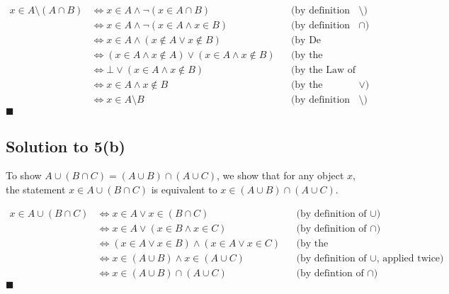 \documentclass{scrartcl}
\begin{document}
    \begin{align*}
        x \in A \setminus (A \cap B) 
        &\Leftrightarrow x \in A \wedge \neg (x \in A \cap B) 
        && \text{(by definition of $\setminus$)} \\
        &\Leftrightarrow x \in A \wedge \neg (x \in A \wedge x \in B)
        && \text{(by definition of $\cap$)} \\
        &\Leftrightarrow x \in A \wedge (x \notin A \vee x \notin B)
        && \text{(by De Morgan's Law)} \\
        &\Leftrightarrow (x \in A \wedge x \notin A) \vee (x \in A \wedge x \notin B)
        && \text{(by the Distributive Law)} \\
        &\Leftrightarrow \bot \vee (x \in A \wedge x \notin B)
        && \text{(by the Law of Contradiction)} \\
        &\Leftrightarrow x \in A \wedge x \notin B
        && \text{(by the Identity Law for $\vee$)} \\
        &\Leftrightarrow x \in A \setminus B
        && \text{(by definition of $\setminus$)}
    \end{align*}
    \hfill $\blacksquare$


    \subsection*{Solution to 5(b)}
    To show $A \cup (B \cap C) = (A \cup B) \cap (A \cup C)$, we show that for any object $x$, the statement $x \in A \cup (B \cap C)$ is equivalent to $x \in (A \cup B) \cap (A \cup C)$.

    \begin{align*}
        x \in A \cup (B \cap C)
        &\Leftrightarrow x \in A \vee x \in (B \cap C)
        && \text{(by definition of $\cup$)} \\
        &\Leftrightarrow x \in A \vee (x \in B \wedge x \in C)
        && \text{(by definition of $\cap$)} \\
        &\Leftrightarrow (x \in A \vee x \in B) \wedge (x \in A \vee x \in C)
        && \text{(by the Distributive Law)} \\
        &\Leftrightarrow x \in (A \cup B) \wedge x \in (A \cup C)
        && \text{(by definition of $\cup$, applied twice)} \\
        &\Leftrightarrow x \in (A \cup B) \cap (A \cup C)
        && \text{(by defintion of $\cap$)}
    \end{align*}
    \hfill $\blacksquare$
\end{document}
